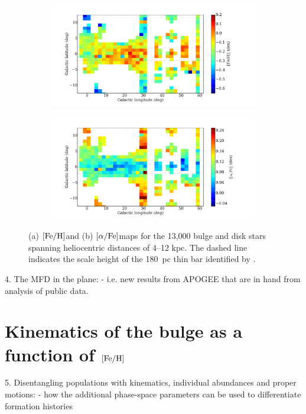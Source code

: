 \documentclass[12pt, preprint]{aastex}
\newcommand{\feh}{\mbox{$\rm [Fe/H]$}}
\newcommand{\alphafe}{\mbox{$\rm [\alpha/Fe]$}}
\begin{document}
\begin{figure}[h!]
    \begin{subfigure}[b]{1.1\textwidth}
    \centering
    \includegraphics[width=0.8\linewidth]{fehmap.pdf}%
\caption{}
  \end{subfigure}%
 
  \begin{subfigure}[b]{1.1\textwidth}
    \centering
    \includegraphics[width=0.8\linewidth]{alphamap.pdf}%
\caption{} 
\end{subfigure}
  \caption{(a) \feh and (b) \alphafe maps for the 13,000 bulge and disk stars spanning heliocentric distances of 4--12  kpc. The dashed line indicates the scale height of the 180~pc thin bar identified by \citet{Wegg2015}.}
  \label{fig:metals}
\end{figure}



4. The MFD in the plane: - i.e. new results from APOGEE that are in hand from
analysis of public data.
\section{Kinematics of the bulge as a function of \feh}

5. Disentangling populations with kinematics, individual abundances and proper
motions: - how the additional phase-space parameters can be used to differentiate
formation histories
\end{document}
